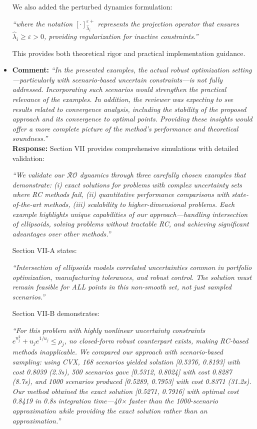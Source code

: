 \documentclass[journal,twoside,web]{ieeecolor}
\begin{document}
\begin{itemize}
We also added the perturbed dynamics formulation:

{\color{revisionblue}\textit{``where the notation $[\cdot]_{\hat{\lambda}_i}^{\varepsilon+}$ represents the projection operator that ensures $\hat{\lambda}_i \geq \varepsilon > 0$, providing regularization for inactive constraints.''}}

This provides both theoretical rigor and practical implementation guidance.\\

\item  \textbf{Comment:} \textit{``In the presented examples, the actual robust optimization setting—particularly with scenario-based uncertain constraints—is not fully addressed. Incorporating such scenarios would strengthen the practical relevance of the examples. In addition, the reviewer was expecting to see results related to convergence analysis, including the stability of the proposed approach and its convergence to optimal points. Providing these insights would offer a more complete picture of the method's performance and theoretical soundness.''}\\

\textbf{Response:} Section VII provides comprehensive simulations with detailed validation:

{\color{revisionblue}\textit{``We validate our $\mathcal{RO}$ dynamics through three carefully chosen examples that demonstrate: (i) exact solutions for problems with complex uncertainty sets where RC methods fail, (ii) quantitative performance comparisons with state-of-the-art methods, (iii) scalability to higher-dimensional problems. Each example highlights unique capabilities of our approach—handling intersection of ellipsoids, solving problems without tractable RC, and achieving significant advantages over other methods.''}}

Section VII-A states:

{\color{revisionblue}\textit{``Intersection of ellipsoids models correlated uncertainties common in portfolio optimization, manufacturing tolerances, and robust control. The solution must remain feasible for ALL points in this non-smooth set, not just sampled scenarios.''}}

Section VII-B demonstrates:

{\color{revisionblue}\textit{``For this problem with highly nonlinear uncertainty constraints $e^{u_j^2}+u_j e^{1/u_j} \leq \rho_j$, no closed-form robust counterpart exists, making RC-based methods inapplicable. We compared our approach with scenario-based sampling: using CVX, 168 scenarios yielded solution [0.5376, 0.8193] with cost 0.8039 (2.3s), 500 scenarios gave [0.5312, 0.8024] with cost 0.8287 (8.7s), and 1000 scenarios produced [0.5289, 0.7953] with cost 0.8371 (31.2s). Our method obtained the exact solution [0.5271, 0.7916] with optimal cost 0.8419 in 0.8s integration time—40× faster than the 1000-scenario approximation while providing the exact solution rather than an approximation.''}}


\end{itemize}
\end{document}
